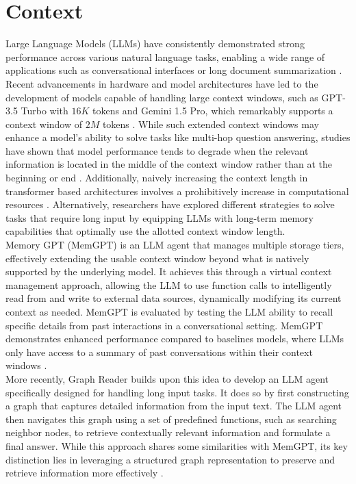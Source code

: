 \section{Context}
\label{sec:context}

Large Language Models (LLMs) have consistently demonstrated strong performance across various natural language tasks, enabling a wide range of applications such as conversational interfaces or long document summarization \cite{minaee2024largelanguagemodelssurvey}. Recent advancements in hardware and model architectures have led to the development of models capable of handling large context windows, such as GPT-3.5 Turbo with $16K$ tokens and Gemini 1.5 Pro, which remarkably supports a context window of $2M$ tokens 
\cite{liu2023lostmiddlelanguagemodels}\cite{geminiteam2024gemini15unlockingmultimodal}. While such extended context windows may enhance a model's ability to solve tasks like multi-hop question answering, studies have shown that model performance tends to degrade when the relevant information is located in the middle of the context window rather than at the beginning or end \cite{liu2023lostmiddlelanguagemodels}. Additionally, naively increasing the context length in transformer based architectures involves a prohibitively increase in computational resources \cite{kitaev2020reformerefficienttransformer}. Alternatively, researchers have explored different strategies to solve tasks that require long input by equipping LLMs with long-term memory capabilities that optimally use the allotted context window length.\\

\noindent Memory GPT (MemGPT) is an LLM agent that manages multiple storage tiers, effectively extending the usable context window beyond what is natively supported by the underlying model. It achieves this through a virtual context management approach, allowing the LLM to use function calls to intelligently read from and write to external data sources, dynamically modifying its current context as needed. MemGPT is evaluated by testing the LLM ability to recall specific details from past interactions in a conversational setting. MemGPT demonstrates enhanced performance compared to baselines models, where LLMs only have access to a summary of past conversations within their context windows \cite{packer2024memgptllmsoperatingsystems}.\\

\noindent More recently, Graph Reader builds upon this idea to develop an LLM agent specifically designed for handling long input tasks. It does so by first constructing a graph that captures detailed information from the input text. The LLM agent then navigates this graph using a set of predefined functions, such as searching neighbor nodes, to retrieve contextually relevant information and formulate a final answer. While this approach shares some similarities with MemGPT, its key distinction lies in leveraging a structured graph representation to preserve and retrieve information more effectively \cite{li2024graphreaderbuildinggraphbasedagent}. 


